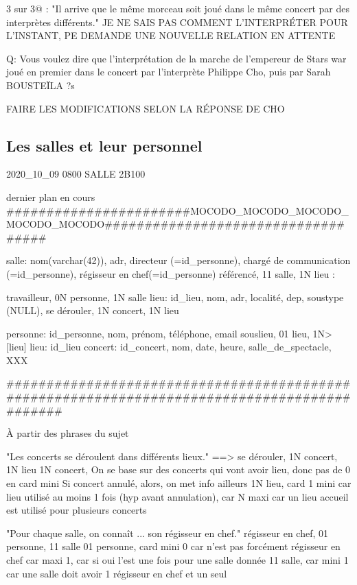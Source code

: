 \documentclass[12pt,a4paper]{article}
\begin{document}
{3 sur 3@ : "Il arrive que le même morceau soit joué dans le même concert par des interprètes différents."
JE NE SAIS PAS COMMENT L'INTERPRÉTER POUR L'INSTANT, PE DEMANDE UNE NOUVELLE RELATION
EN ATTENTE

Q: Vous voulez dire que l'interprétation de la marche de l'empereur de Stars war joué en premier
dans le concert par l'interprète Philippe Cho, puis par Sarah BOUSTEÏLA ?s

FAIRE LES MODIFICATIONS SELON LA RÉPONSE DE CHO




\subsection{Les salles et leur personnel}
2020_10_09 0800 SALLE 2B100


dernier plan en cours
#######################MOCODO_MOCODO_MOCODO_MOCODO_MOCODO###################################

salle: nom(varchar(42)), adr, directeur (=id_personne), chargé de communication (=id_personne), régisseur en chef(=id_personne)
référencé, 11 salle, 1N lieu
:

travailleur, 0N personne, 1N salle
lieu: id_lieu, nom, adr, localité, dep, soustype (NULL),
se dérouler, 1N concert, 1N lieu

personne: id_personne, nom, prénom, téléphone, email
souslieu, 01 lieu,   1N> [lieu] lieu: id_lieu
concert: id_concert, nom, date, heure, salle_de_spectacle, XXX

#############################################################################################



À partir des phrases du sujet

"Les concerts se déroulent dans différents lieux."
==> se dérouler, 1N concert, 1N lieu
1N concert, On se base sur des concerts qui vont avoir lieu, donc pas de 0 en card mini
Si concert annulé, alors, on met info ailleurs
1N lieu, card 1 mini car lieu utilisé au moins 1 fois (hyp avant annulation),
car N maxi car un lieu accueil est utilisé pour plusieurs concerts 


"Pour chaque salle, on connaît ... son régisseur en chef."
régisseur en chef, 01 personne, 11 salle
01 personne, card mini 0 car n'est pas forcément régisseur en chef
car maxi 1, car si oui l'est une fois pour une salle donnée
11 salle, car mini 1 car une salle doit avoir 1 régisseur en chef et un seul

}
\end{document}
